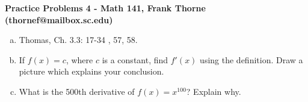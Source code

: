 \documentclass[12pt]{article}
\begin{document}
\setlength{\topmargin}{-2mm}





\begin{center}{\bf Practice Problems 4 - Math 141, Frank Thorne (thornef@mailbox.sc.edu)}
\end{center}
\begin{enumerate}[(a)]

\item
Thomas, Ch. 3.3: 17-34 , 57, 58.

\item

If $f(x) = c$, where $c$ is a constant, find $f'(x)$ using the definition.
Draw a picture which explains your conclusion.

\item
What is the 500th derivative of $f(x) = x^{100}$? Explain why.

\end{enumerate}
\end{document}
